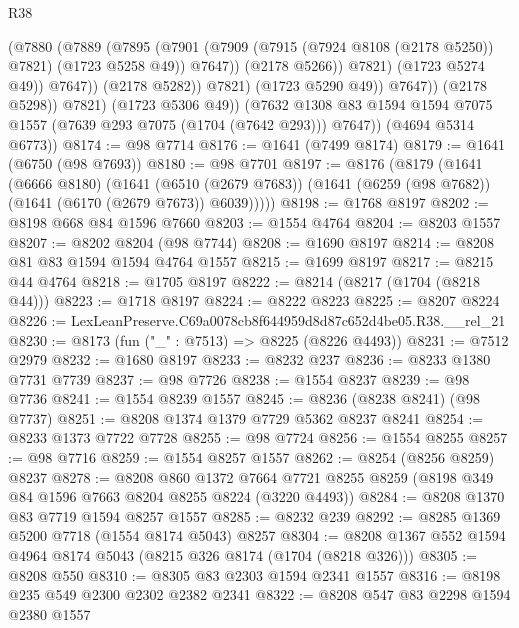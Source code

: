 \begin{lexlean}{R38}
\begin{coremodule}
                              (@7880
                                (@7889
                                  (@7895
                                    (@7901
                                      (@7909
                                        (@7915 (@7924 @8108 (@2178 @5250)) @7821)
                                        (@1723 @5258 @49))
                                      @7647))
                                  (@2178 @5266))
                                @7821)
                              (@1723 @5274 @49))
                            @7647))
                        (@2178 @5282))
                      @7821)
                    (@1723 @5290 @49))
                  @7647))
              (@2178 @5298))
            @7821)
          (@1723 @5306 @49))
        (@7632 @1308 @83 @1594 @1594 @7075 @1557 (@7639 @293 @7075 (@1704 (@7642 @293))) @7647))
      (@4694 @5314 @6773))
@8174 := @98 @7714
@8176 := @1641 (@7499 @8174)
@8179 := @1641 (@6750 (@98 @7693))
@8180 := @98 @7701
@8197 := @8176
    (@8179
      (@1641
        (@6666 @8180)
        (@1641
          (@6510 (@2679 @7683))
          (@1641 (@6259 (@98 @7682)) (@1641 (@6170 (@2679 @7673)) @6039)))))
@8198 := @1768 @8197
@8202 := @8198 @668 @84 @1596 @7660
@8203 := @1554 @4764
@8204 := @8203 @1557
@8207 := @8202 @8204 (@98 @7744)
@8208 := @1690 @8197
@8214 := @8208 @81 @83 @1594 @1594 @4764 @1557
@8215 := @1699 @8197
@8217 := @8215 @44 @4764
@8218 := @1705 @8197
@8222 := @8214 (@8217 (@1704 (@8218 @44)))
@8223 := @1718 @8197
@8224 := @8222 @8223
@8225 := @8207 @8224
@8226 := LexLeanPreserve.C69a0078cb8f644959d8d87c652d4be05.R38.__rel_21
@8230 := @8173 (fun ("_" : @7513) => @8225 (@8226 @4493))
@8231 := @7512 @2979
@8232 := @1680 @8197
@8233 := @8232 @237
@8236 := @8233 @1380 @7731 @7739
@8237 := @98 @7726
@8238 := @1554 @8237
@8239 := @98 @7736
@8241 := @1554 @8239 @1557
@8245 := @8236 (@8238 @8241) (@98 @7737)
@8251 := @8208 @1374 @1379 @7729 @5362 @8237 @8241
@8254 := @8233 @1373 @7722 @7728
@8255 := @98 @7724
@8256 := @1554 @8255
@8257 := @98 @7716
@8259 := @1554 @8257 @1557
@8262 := @8254 (@8256 @8259) @8237
@8278 := @8208
    @860
    @1372
    @7664
    @7721
    @8255
    @8259
    (@8198 @349 @84 @1596 @7663 @8204 @8255 @8224 (@3220 @4493))
@8284 := @8208 @1370 @83 @7719 @1594 @8257 @1557
@8285 := @8232 @239
@8292 := @8285 @1369 @5200 @7718 (@1554 @8174 @5043) @8257
@8304 := @8208 @1367 @552 @1594 @4964 @8174 @5043 (@8215 @326 @8174 (@1704 (@8218 @326)))
@8305 := @8208 @550
@8310 := @8305 @83 @2303 @1594 @2341 @1557
@8316 := @8198 @235 @549 @2300 @2302 @2382 @2341
@8322 := @8208 @547 @83 @2298 @1594 @2380 @1557

\end{coremodule}
\end{lexlean}
